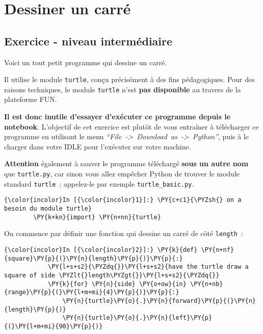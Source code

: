     
    
    
    

    

    \hypertarget{dessiner-un-carruxe9}{%
\section{Dessiner un carré}\label{dessiner-un-carruxe9}}

    \hypertarget{exercice---niveau-intermuxe9diaire}{%
\subsection{Exercice - niveau
intermédiaire}\label{exercice---niveau-intermuxe9diaire}}

    Voici un tout petit programme qui dessine un carré.

    Il utilise le module \texttt{turtle}, conçu précisément à des fins
pédagogiques. Pour des raisons techniques, le module \texttt{turtle}
n'est \textbf{pas disponible} au travers de la plateforme FUN.

    \textbf{Il est donc inutile d'essayer d'exécuter ce programme depuis le
notebook}. L'objectif de cet exercice est plutôt de vous entraîner à
télécharger ce programme en utilisant le menu
\emph{``File~-\textgreater{}~Download~as~-\textgreater{}~Python''}, puis
à le charger dans votre IDLE pour l'exécuter sur votre machine.

    \textbf{Attention} également à sauver le programme téléchargé
\textbf{sous un autre nom} que \texttt{turtle.py}, car sinon vous allez
empêcher Python de trouver le module standard \texttt{turtle}~;
appelez-le par exemple \texttt{turtle\_basic.py}.

    \begin{Verbatim}[commandchars=\\\{\},frame=single,framerule=0.3mm,rulecolor=\color{cellframecolor}]
{\color{incolor}In [{\color{incolor}1}]:} \PY{c+c1}{\PYZsh{} on a besoin du module turtle}
        \PY{k+kn}{import} \PY{n+nn}{turtle}
\end{Verbatim}


    On commence par définir une fonction qui dessine un carré de côté
\texttt{length}~:

    \begin{Verbatim}[commandchars=\\\{\},frame=single,framerule=0.3mm,rulecolor=\color{cellframecolor}]
{\color{incolor}In [{\color{incolor}2}]:} \PY{k}{def} \PY{n+nf}{square}\PY{p}{(}\PY{n}{length}\PY{p}{)}\PY{p}{:}
            \PY{l+s+s2}{\PYZdq{}}\PY{l+s+s2}{have the turtle draw a square of side \PYZlt{}length\PYZgt{}}\PY{l+s+s2}{\PYZdq{}}
            \PY{k}{for} \PY{n}{side} \PY{o+ow}{in} \PY{n+nb}{range}\PY{p}{(}\PY{l+m+mi}{4}\PY{p}{)}\PY{p}{:}
                \PY{n}{turtle}\PY{o}{.}\PY{n}{forward}\PY{p}{(}\PY{n}{length}\PY{p}{)}
                \PY{n}{turtle}\PY{o}{.}\PY{n}{left}\PY{p}{(}\PY{l+m+mi}{90}\PY{p}{)}
\end{Verbatim}



